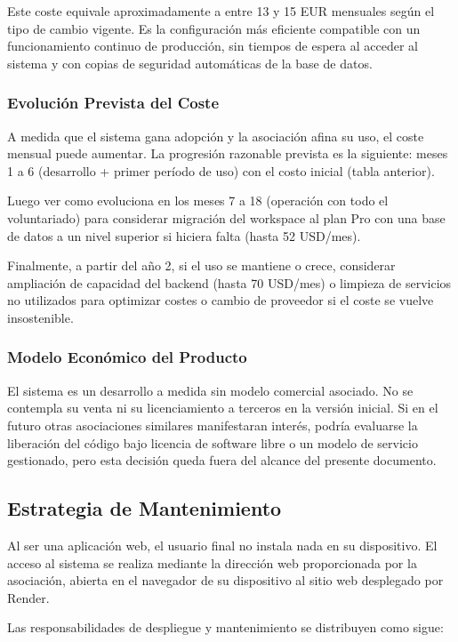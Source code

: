 \par
\vspace{5mm}

Este coste equivale aproximadamente a entre 13 y 15 EUR mensuales según
el tipo de cambio vigente. Es la configuración más eficiente compatible
con un funcionamiento continuo de producción, sin tiempos de espera al
acceder al sistema y con copias de seguridad automáticas de la base de
datos.


\subsubsection{Evolución Prevista del Coste}
A medida que el sistema gana adopción y la asociación afina su uso, el
coste mensual puede aumentar. La progresión razonable
prevista es la siguiente: meses 1 a 6 (desarrollo + primer período de uso) con el costo inicial (tabla anterior).
\par
\vspace{5mm} 
Luego ver como evoluciona en los meses 7 a 18 (operación con todo el voluntariado) para considerar migración del workspace 
al plan Pro con una base de datos a un nivel superior si hiciera falta (hasta 52 USD/mes). 
\par
\vspace{5mm}
Finalmente, a partir del año 2, 
si el uso se mantiene o crece, considerar ampliación de capacidad del backend (hasta 70 USD/mes) o limpieza de servicios 
no utilizados para optimizar costes o cambio de proveedor si el coste se vuelve insostenible.


\subsubsection{Modelo Económico del Producto}
El sistema es un desarrollo a medida sin modelo comercial asociado.
No se contempla su venta ni su licenciamiento a terceros en la versión
inicial. Si en el futuro otras asociaciones similares manifestaran
interés, podría evaluarse la liberación del código bajo licencia de
software libre o un modelo de servicio gestionado, pero esta decisión
queda fuera del alcance del presente documento.


\subsection{Estrategia de Mantenimiento}
Al ser una aplicación web, el usuario final no instala nada en su
dispositivo. El acceso al sistema se realiza mediante la dirección web
proporcionada por la asociación, abierta en el navegador de su
dispositivo al sitio web desplegado por Render.
\par
\vspace{5mm}
Las responsabilidades de despliegue y mantenimiento se
distribuyen como sigue:

